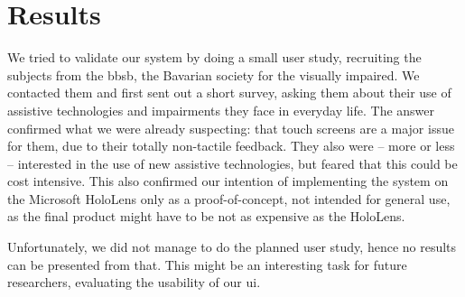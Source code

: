 \section{Results}
We tried to validate our system by doing a small user study, recruiting the subjects from the \ac{bbsb}, the Bavarian society for the visually impaired.
We contacted them and first sent out a short survey, asking them about their use of assistive technologies and impairments they face in everyday life.
The answer confirmed what we were already suspecting: that touch screens are a major issue for them, due to their totally non-tactile feedback.
They also were -- more or less -- interested in the use of new assistive technologies, but feared that this could be cost intensive.
This also confirmed our  intention of implementing the system on the Microsoft HoloLens only as a proof-of-concept, not intended for general use, as the final product might have to be not as expensive as the HoloLens.

Unfortunately, we did not manage to do the planned user study, hence no results can be presented from that.
This might be an interesting task for future researchers, evaluating the usability of our \ac{ui}.

